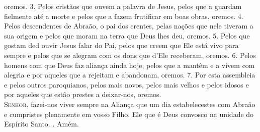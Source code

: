 \documentclass{book}
\begin{document}
\begin{flushleft}
    oremos.
    \vspace{.2cm}
    \newline
    {\color{VioletRed2} 3.} Pelos cristãos que ouvem a palavra de Jesus,
    \newline
    pelos que a guardam fielmente até a morte
    \newline
    e pelos que a fazem frutificar em boas obras,
    \newline
    oremos.
    \vspace{.2cm}
    \newline
    {\color{VioletRed2} 4.} Pelos descendentes de Abraão, o pai dos crentes,
    \newline
    pelas nações que nele tiveram a sua origem
    \newline
    e pelos que moram na terra que Deus lhes deu,
    \newline
    oremos.
    \vspace{.2cm}
    \newline
    {\color{VioletRed2} 5.} Pelos que gostam ded ouvir Jesus falar do Pai,
    \newline
    pelos que creem que Ele está vivo para sempre
    \newline
    e pelos que se alegram com os dons que d'Ele receberam,
    \newline
    oremos.
    \vspace{.2cm}
    \newline
    {\color{VioletRed2} 6.} Pelos homens com que Deus faz aliança ainda hoje,
    \newline
    pelos que a mantêm e a vivem com alegria
    \newline
    e por aqueles que a rejeitam e abandonam,
    \newline
    oremos.
    \vspace{.2cm}
    \newline
    {\color{VioletRed2} 7.} Por esta assembleia e pelos outros paroquianos,
    \newline
    pelos mais novos, pelos mais velhos e pelos idosos
    \newline
    e por aqueles que estão prestes a deixar-nos,
    \newline
    oremos.
    \vspace{.2cm} \\
    \lettrine[findent=2pt]{\color{VioletRed2}S}{enhor}, fazei-nos viver sempre na Aliança
    \newline
    que um dia estabelecestes com Abraão
    \newline
    e cumpristes plenamente em vosso Filho.
    \newline
    Ele que é Deus convosco na unidade do Espírito Santo.
    \newline
    {\color{VioletRed2} \Rbar.} Amém.
\end{flushleft}
\end{document}
